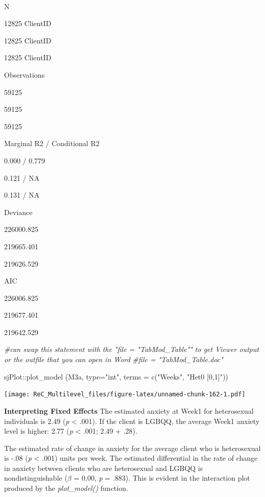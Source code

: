 \documentclass[
  11pt,
]{book}
\newenvironment{Shaded}{\begin{snugshade}}{\end{snugshade}}
\newcommand{\AttributeTok}[1]{\textcolor[rgb]{0.77,0.63,0.00}{#1}}
\newcommand{\CommentTok}[1]{\textcolor[rgb]{0.56,0.35,0.01}{\textit{#1}}}
\newcommand{\FunctionTok}[1]{\textcolor[rgb]{0.00,0.00,0.00}{#1}}
\newcommand{\NormalTok}[1]{#1}
\newcommand{\SpecialCharTok}[1]{\textcolor[rgb]{0.00,0.00,0.00}{#1}}
\newcommand{\StringTok}[1]{\textcolor[rgb]{0.31,0.60,0.02}{#1}}
\begin{document}
~

N

12825 ClientID

12825 ClientID

12825 ClientID

Observations

59125

59125

59125

Marginal R2 / Conditional R2

0.000 / 0.779

0.121 / NA

0.131 / NA

Deviance

226000.825

219665.401

219626.529

AIC

226006.825

219677.401

219642.529

\begin{Shaded}
\begin{Highlighting}[]
\CommentTok{\#can swap this statement with the "file = "TabMod\_Table"" to get Viewer output or the outfile that you can open in Word}
\CommentTok{\#file = "TabMod\_Table.doc"}
\end{Highlighting}
\end{Shaded}

\begin{Shaded}
\begin{Highlighting}[]
\NormalTok{sjPlot}\SpecialCharTok{::}\FunctionTok{plot\_model}\NormalTok{ (M3a, }\AttributeTok{type=}\StringTok{"int"}\NormalTok{, }\AttributeTok{terms =} \FunctionTok{c}\NormalTok{(}\StringTok{"Weeks"}\NormalTok{, }\StringTok{"Het0 [0,1]"}\NormalTok{))}
\end{Highlighting}
\end{Shaded}

\texttt{[image: ReC\_Multilevel\_files/figure-latex/unnamed-chunk-162-1.pdf]}

\textbf{Interpreting Fixed Effects}
The estimated anxiety at Week1 for heterosexual individuals is 2.49 (\emph{p} \textless{} .001). If the client is LGBQQ, the average Week1 anxiety level is higher: 2.77 (\emph{p} \textless{} .001; 2.49 + .28).

The estimated rate of change in anxiety for the average client who is heterosexual is -.08 (\emph{p} \textless{} .001) units per week. The estimated differential in the rate of change in anxiety between clients who are heterosexual and LGBQQ is nondistinguishable (\(\beta\) = 0.00, \emph{p} = .883). This is evident in the interaction plot produced by the \emph{plot\_model()} function.
\end{document}

